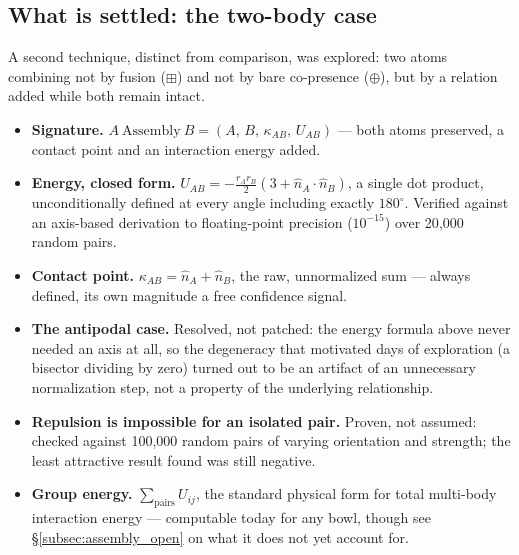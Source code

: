 \documentclass[12pt, a4paper]{article}
\begin{document}
\subsection{What is settled: the two-body case}
\label{subsec:assembly_settled}
A second technique, distinct from comparison, was explored: two
atoms combining not by fusion ($\boxplus$) and not by bare
co-presence ($\oplus$), but by a relation added while both remain
intact.
\begin{itemize}
\item \textbf{Signature.} $A\ \mathrm{Assembly}\ B =
      (A,\,B,\,\kappa_{AB},\,U_{AB})$ --- both atoms preserved, a
      contact point and an interaction energy added.
\item \textbf{Energy, closed form.}
      $U_{AB} = -\tfrac{r_A r_B}{2}(3+\hat n_A\cdot\hat n_B)$, a
      single dot product, unconditionally defined at every angle
      including exactly $180^\circ$. Verified against an
      axis-based derivation to floating-point precision
      ($10^{-15}$) over 20{,}000 random pairs.
\item \textbf{Contact point.} $\kappa_{AB}=\hat n_A+\hat n_B$, the
      raw, unnormalized sum --- always defined, its own magnitude a
      free confidence signal.
\item \textbf{The antipodal case.} Resolved, not patched: the
      energy formula above never needed an axis at all, so the
      degeneracy that motivated days of exploration (a bisector
      dividing by zero) turned out to be an artifact of an
      unnecessary normalization step, not a property of the
      underlying relationship.
\item \textbf{Repulsion is impossible for an isolated pair.} Proven,
      not assumed: checked against 100{,}000 random pairs of varying
      orientation and strength; the least attractive result found
      was still negative.
\item \textbf{Group energy.} $\sum_{\text{pairs}} U_{ij}$, the
      standard physical form for total multi-body interaction
      energy --- computable today for any bowl, though see
      \S\ref{subsec:assembly_open} on what it does not yet account
      for.
\end{itemize}
\end{document}

